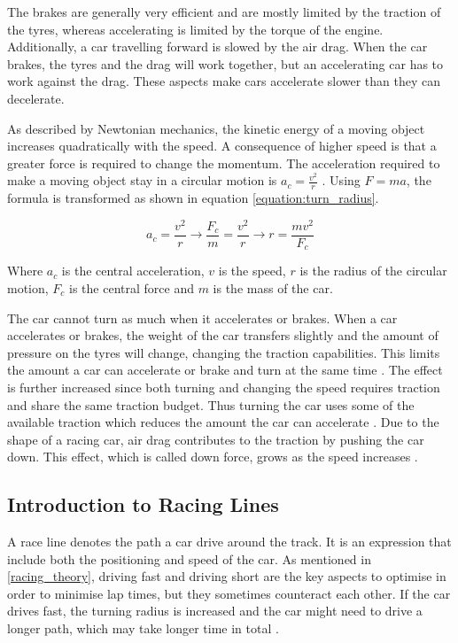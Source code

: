 The brakes are generally very efficient and are mostly limited by the traction of the tyres, whereas accelerating is limited by the torque of the engine. Additionally, a car travelling forward is slowed by the air drag. When the car brakes, the tyres and the drag will work together, but an accelerating car has to work against the drag. These aspects make cars accelerate slower than they can decelerate.

As described by Newtonian mechanics, the kinetic energy of a moving object increases quadratically with the speed. A consequence of higher speed is that a greater force is required to change the momentum. The acceleration required to make a moving object stay in a circular motion is \(a_c=\frac{v^2}{r}\)  \cite{beckman}. Using \(F=ma\), the formula is transformed as shown in equation \ref{equation:turn_radius}. 

\begin{equation}
\label{equation:turn_radius}
a_c = \frac{v^2}{r} 
\rightarrow
\frac{F_c}{m} = \frac{v^2}{r} 
\rightarrow
r = \frac{mv^2}{F_c}
\end{equation}

\noindent
Where $a_c$ is the central acceleration, $v$ is the speed, $r$ is the radius of the circular motion, $F_c$ is the central force and $m$ is the mass of the car. 

The car cannot turn as much when it accelerates or brakes. When a car accelerates or brakes, the weight of the car transfers slightly and the amount of pressure on the tyres will change, changing the traction capabilities. This limits the amount a car can accelerate or brake and turn at the same time \cite{beckman}. The effect is further increased since both turning and changing the speed requires traction and share the same traction budget. Thus turning the car uses some of the available traction which reduces the amount the car can accelerate \cite{beckman, edmondson}. Due to the shape of a racing car, air drag contributes to the traction by pushing the car down. This effect, which is called down force, grows as the speed increases \cite{beckman}.

\subsection{Introduction to Racing Lines}
\label{racing_theory:lines}
A race line denotes the path a car drive around the track. It is an expression that include both the positioning and speed of the car. As mentioned in \ref{racing_theory}, driving fast and driving short are the key aspects to optimise in order to minimise lap times, but they sometimes counteract each other. If the car drives fast, the turning radius is increased and the car might need to drive a longer path, which may take longer time in total \cite{edmondson}. 

